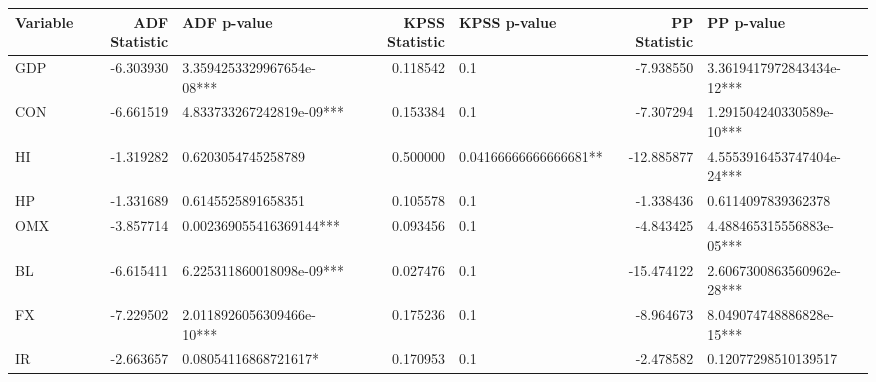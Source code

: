 \begin{tabular}{lrlrlrl}
\toprule
Variable & ADF Statistic & ADF p-value & KPSS Statistic & KPSS p-value & PP Statistic & PP p-value \\
\midrule
GDP & -6.303930 & 3.3594253329967654e-08*** & 0.118542 & 0.1 & -7.938550 & 3.3619417972843434e-12*** \\
CON & -6.661519 & 4.833733267242819e-09*** & 0.153384 & 0.1 & -7.307294 & 1.291504240330589e-10*** \\
HI & -1.319282 & 0.6203054745258789 & 0.500000 & 0.04166666666666681** & -12.885877 & 4.5553916453747404e-24*** \\
HP & -1.331689 & 0.6145525891658351 & 0.105578 & 0.1 & -1.338436 & 0.6114097839362378 \\
OMX & -3.857714 & 0.002369055416369144*** & 0.093456 & 0.1 & -4.843425 & 4.488465315556883e-05*** \\
BL & -6.615411 & 6.225311860018098e-09*** & 0.027476 & 0.1 & -15.474122 & 2.6067300863560962e-28*** \\
FX & -7.229502 & 2.0118926056309466e-10*** & 0.175236 & 0.1 & -8.964673 & 8.049074748886828e-15*** \\
IR & -2.663657 & 0.08054116868721617* & 0.170953 & 0.1 & -2.478582 & 0.12077298510139517 \\
\bottomrule
\end{tabular}
